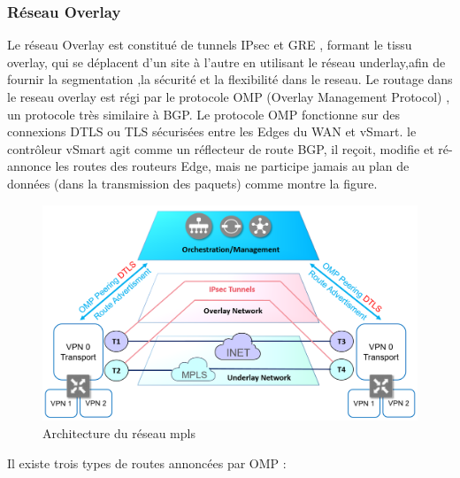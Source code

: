 \subsubsection{Réseau Overlay }

Le réseau Overlay est constitué de tunnels IPsec et GRE , formant le tissu overlay, qui se déplacent d'un site à l'autre en utilisant le réseau underlay,afin de fournir la segmentation ,la sécurité et la flexibilité dans le reseau.
Le routage dans le reseau overlay est régi par le protocole OMP (Overlay Management Protocol) , un protocole très similaire à BGP. Le protocole OMP fonctionne sur des connexions DTLS ou TLS sécurisées entre les Edges du WAN et vSmart. le contrôleur vSmart agit comme un réflecteur de route BGP, il reçoit, modifie et ré-annonce les routes des routeurs Edge, mais ne participe jamais au plan de données (dans la transmission des paquets) comme montre la figure.
	\begin{figure} [H]
	\begin{center}
		\centering
		\hspace*{-0.5cm}
	\includegraphics{../image/Overlay}
	\end{center}
	\caption{Architecture du réseau mpls}
\end{figure} 

Il existe trois types de routes annoncées par OMP :

